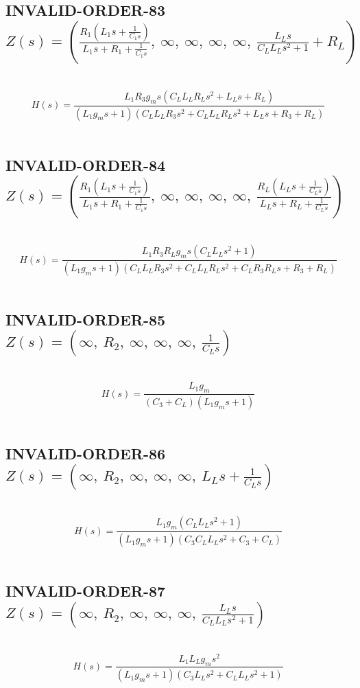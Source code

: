 \documentclass{article}
\begin{document}
\subsection{INVALID-ORDER-83 $Z(s) = \left( \frac{R_{1} \left(L_{1} s + \frac{1}{C_{1} s}\right)}{L_{1} s + R_{1} + \frac{1}{C_{1} s}}, \  \infty, \  \infty, \  \infty, \  \infty, \  \frac{L_{L} s}{C_{L} L_{L} s^{2} + 1} + R_{L}\right)$ } \ 
\textbf{\[H(s) = \frac{L_{1} R_{3} g_{m} s \left(C_{L} L_{L} R_{L} s^{2} + L_{L} s + R_{L}\right)}{\left(L_{1} g_{m} s + 1\right) \left(C_{L} L_{L} R_{3} s^{2} + C_{L} L_{L} R_{L} s^{2} + L_{L} s + R_{3} + R_{L}\right)}\] } \ 
\subsection{INVALID-ORDER-84 $Z(s) = \left( \frac{R_{1} \left(L_{1} s + \frac{1}{C_{1} s}\right)}{L_{1} s + R_{1} + \frac{1}{C_{1} s}}, \  \infty, \  \infty, \  \infty, \  \infty, \  \frac{R_{L} \left(L_{L} s + \frac{1}{C_{L} s}\right)}{L_{L} s + R_{L} + \frac{1}{C_{L} s}}\right)$ } \ 
\textbf{\[H(s) = \frac{L_{1} R_{3} R_{L} g_{m} s \left(C_{L} L_{L} s^{2} + 1\right)}{\left(L_{1} g_{m} s + 1\right) \left(C_{L} L_{L} R_{3} s^{2} + C_{L} L_{L} R_{L} s^{2} + C_{L} R_{3} R_{L} s + R_{3} + R_{L}\right)}\] } \ 
\subsection{INVALID-ORDER-85 $Z(s) = \left( \infty, \  R_{2}, \  \infty, \  \infty, \  \infty, \  \frac{1}{C_{L} s}\right)$ } \ 
\textbf{\[H(s) = \frac{L_{1} g_{m}}{\left(C_{3} + C_{L}\right) \left(L_{1} g_{m} s + 1\right)}\] } \ 
\subsection{INVALID-ORDER-86 $Z(s) = \left( \infty, \  R_{2}, \  \infty, \  \infty, \  \infty, \  L_{L} s + \frac{1}{C_{L} s}\right)$ } \ 
\textbf{\[H(s) = \frac{L_{1} g_{m} \left(C_{L} L_{L} s^{2} + 1\right)}{\left(L_{1} g_{m} s + 1\right) \left(C_{3} C_{L} L_{L} s^{2} + C_{3} + C_{L}\right)}\] } \ 
\subsection{INVALID-ORDER-87 $Z(s) = \left( \infty, \  R_{2}, \  \infty, \  \infty, \  \infty, \  \frac{L_{L} s}{C_{L} L_{L} s^{2} + 1}\right)$ } \ 
\textbf{\[H(s) = \frac{L_{1} L_{L} g_{m} s^{2}}{\left(L_{1} g_{m} s + 1\right) \left(C_{3} L_{L} s^{2} + C_{L} L_{L} s^{2} + 1\right)}\] } \ 
\end{document}
